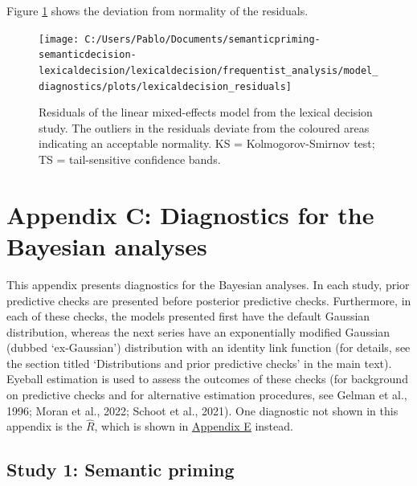 \documentclass[
  12pt,
  man,floatsintext]{apa7}
\begin{document}
Figure \ref{fig:lexicaldecision-residuals} shows the deviation from normality of the residuals.

\begin{figure}

{\centering \texttt{[image: C:/Users/Pablo/Documents/semanticpriming-semanticdecision-lexicaldecision/lexicaldecision/frequentist\_analysis/model\_diagnostics/plots/lexicaldecision\_residuals]} 

}

\caption{Residuals of the linear mixed-effects model from the lexical decision study. The outliers in the residuals deviate from the coloured areas indicating an acceptable normality. \linebreak KS = Kolmogorov-Smirnov test; TS = tail-sensitive confidence bands.}\label{fig:lexicaldecision-residuals}
\end{figure}

\clearpage

\renewcommand{\thefigure}{C\arabic{figure}} \setcounter{figure}{0}
\renewcommand{\thetable}{C\arabic{table}} \setcounter{table}{0}

\hypertarget{appendix-C-Bayesian-analysis-diagnostics}{%
\section{Appendix C: Diagnostics for the Bayesian analyses}\label{appendix-C-Bayesian-analysis-diagnostics}}

This appendix presents diagnostics for the Bayesian analyses. In each study, prior predictive checks are presented before posterior predictive checks. Furthermore, in each of these checks, the models presented first have the default Gaussian distribution, whereas the next series have an exponentially modified Gaussian (dubbed `ex-Gaussian') distribution with an identity link function (for details, see the section titled `Distributions and prior predictive checks' in the main text). Eyeball estimation is used to assess the outcomes of these checks (for background on predictive checks and for alternative estimation procedures, see Gelman et al., 1996; Moran et al., 2022; Schoot et al., 2021). One diagnostic not shown in this appendix is the \(\widehat R\), which is shown in \protect\hyperlink{appendix-E-Bayesian-analysis-results}{\underline{Appendix E}} instead.

\hypertarget{study1-bayesian-diagnostics}{%
\subsection{Study 1: Semantic priming}\label{study1-bayesian-diagnostics}}
\end{document}
